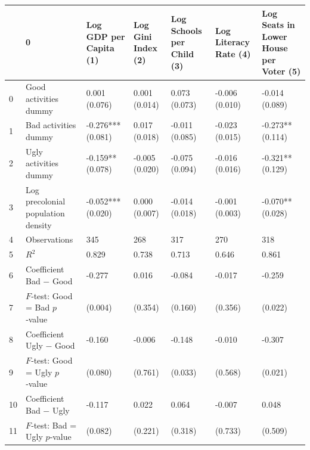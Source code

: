 \begin{tabular}{lllllll}
\toprule
 & 0 & Log GDP per Capita
(1) & Log Gini Index
(2) & Log Schools per Child
(3) & Log Literacy Rate
(4) & Log Seats in Lower House per Voter
(5) \\
\midrule
0 & Good activities dummy & 0.001
(0.076) & 0.001
(0.014) & 0.073
(0.073) & -0.006
(0.010) & -0.014
(0.089) \\
1 & Bad activities dummy & -0.276***
(0.081) & 0.017
(0.018) & -0.011
(0.085) & -0.023
(0.015) & -0.273**
(0.114) \\
2 & Ugly activities dummy & -0.159**
(0.078) & -0.005
(0.020) & -0.075
(0.094) & -0.016
(0.016) & -0.321**
(0.129) \\
3 & Log precolonial population density & -0.052***
(0.020) & 0.000
(0.007) & -0.014
(0.018) & -0.001
(0.003) & -0.070**
(0.028) \\
4 & Observations & 345 & 268 & 317 & 270 & 318 \\
5 & $R^2$ & 0.829 & 0.738 & 0.713 & 0.646 & 0.861 \\
6 & Coefficient Bad − Good & -0.277 & 0.016 & -0.084 & -0.017 & -0.259 \\
7 & $F$‑test: Good = Bad $p$‑value & (0.004) & (0.354) & (0.160) & (0.356) & (0.022) \\
8 & Coefficient Ugly − Good & -0.160 & -0.006 & -0.148 & -0.010 & -0.307 \\
9 & $F$‑test: Good = Ugly $p$‑value & (0.080) & (0.761) & (0.033) & (0.568) & (0.021) \\
10 & Coefficient Bad − Ugly & -0.117 & 0.022 & 0.064 & -0.007 & 0.048 \\
11 & $F$‑test: Bad = Ugly $p$‑value & (0.082) & (0.221) & (0.318) & (0.733) & (0.509) \\
\bottomrule
\end{tabular}

